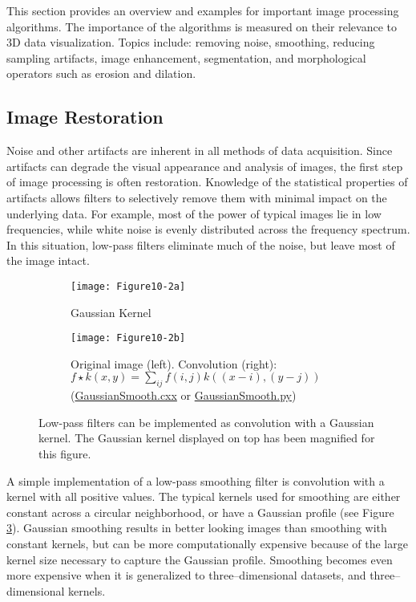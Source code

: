 This section provides an overview and examples for important image processing algorithms. The importance of the algorithms is measured on their relevance to 3D data visualization. Topics include: removing noise, smoothing, reducing sampling artifacts, image enhancement, segmentation, and morphological operators such as erosion and dilation.

\subsection{Image Restoration}

Noise and other artifacts are inherent in all methods of data acquisition. Since artifacts can degrade the visual appearance and analysis of images, the first step of image processing is often restoration. Knowledge of the statistical properties of artifacts allows filters to selectively remove them with minimal impact on the underlying data. For example, most of the power of typical images lie in low frequencies, while white noise is evenly distributed across the frequency spectrum. In this situation, low-pass filters eliminate much of the noise, but leave most of the image intact.

\begin{figure}[htb]
	\begin{subfigure}[h]{0.24\linewidth}
		\texttt{[image: Figure10-2a]}
		\captionsetup{justification=centering}
		\caption*{Gaussian Kernel}
		\label{fig:Figure10-2a}
	\end{subfigure}
	\hfill
	\begin{subfigure}[h]{0.98\linewidth}
		\texttt{[image: Figure10-2b]}
		\captionsetup{justification=centering}
		\caption*{Original image (left). Convolution (right):
         $f \star k(x,y) = \sum_{ij}f(i,j)k((x-i),(y-j))$\\ (\href{https://lorensen.github.io/VTKExamples/site/Cxx/ImageProcessing/GaussianSmooth/}{GaussianSmooth.cxx} or \href{https://lorensen.github.io/VTKExamples/site/Python/ImageProcessing/GaussianSmooth/}{GaussianSmooth.py})}
		\label{fig:Figure10-2b}
	\end{subfigure}
	\caption{Low-pass filters can be implemented as convolution with a Gaussian kernel. The Gaussian kernel displayed on top has been magnified for this figure.}\label{fig:Figure10-2}
\end{figure}

A simple implementation of a low-pass smoothing filter is convolution with a kernel with all positive values. The typical kernels used for smoothing are either constant across a circular neighborhood, or have a Gaussian profile (see Figure \ref{fig:Figure10-2}). Gaussian smoothing results in better looking images than smoothing with constant kernels, but can be more computationally expensive because of the large kernel size necessary to capture the Gaussian profile. Smoothing becomes even more expensive when it is generalized to three--dimensional datasets, and three--dimensional kernels.

